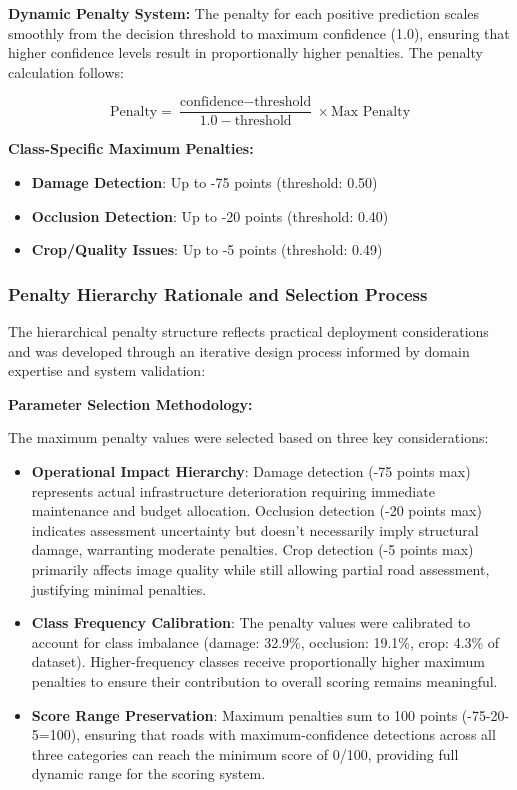 \documentclass[12pt]{article}
\begin{document}
\textbf{Dynamic Penalty System:}
The penalty for each positive prediction scales smoothly from the decision threshold to maximum confidence (1.0), ensuring that higher confidence levels result in proportionally higher penalties. The penalty calculation follows:

$$\text{Penalty} = \frac{\text{confidence} - \text{threshold}}{1.0 - \text{threshold}} \times \text{Max Penalty}$$

\textbf{Class-Specific Maximum Penalties:}
\begin{itemize}[itemsep=1pt,parsep=0pt,topsep=2pt]
\item \textbf{Damage Detection}: Up to -75 points (threshold: 0.50)
\item \textbf{Occlusion Detection}: Up to -20 points (threshold: 0.40) 
\item \textbf{Crop/Quality Issues}: Up to -5 points (threshold: 0.49)
\end{itemize}

\subsubsection{Penalty Hierarchy Rationale and Selection Process}

The hierarchical penalty structure reflects practical deployment considerations and was developed through an iterative design process informed by domain expertise and system validation:

\textbf{Parameter Selection Methodology:}

The maximum penalty values were selected based on three key considerations:

\begin{itemize}[itemsep=1pt,parsep=0pt,topsep=3pt]
\item \textbf{Operational Impact Hierarchy}: Damage detection (-75 points max) represents actual infrastructure deterioration requiring immediate maintenance and budget allocation. Occlusion detection (-20 points max) indicates assessment uncertainty but doesn't necessarily imply structural damage, warranting moderate penalties. Crop detection (-5 points max) primarily affects image quality while still allowing partial road assessment, justifying minimal penalties.

\item \textbf{Class Frequency Calibration}: The penalty values were calibrated to account for class imbalance (damage: 32.9\%, occlusion: 19.1\%, crop: 4.3\% of dataset). Higher-frequency classes receive proportionally higher maximum penalties to ensure their contribution to overall scoring remains meaningful.

\item \textbf{Score Range Preservation}: Maximum penalties sum to 100 points (-75-20-5=100), ensuring that roads with maximum-confidence detections across all three categories can reach the minimum score of 0/100, providing full dynamic range for the scoring system.
\end{itemize}
\end{document}
